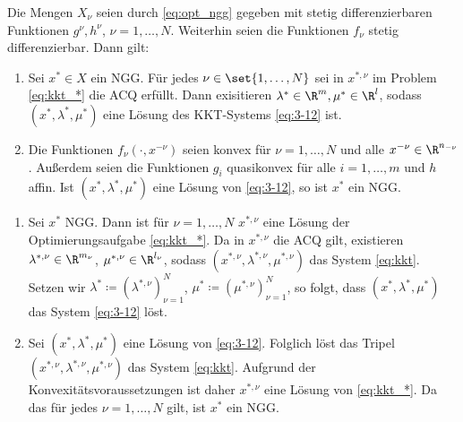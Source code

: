 \begin{satz}\label{thm:3.19}
  Die Mengen $X_{\nu}$ seien durch \eqref{eq:opt_ngg} gegeben mit stetig differenzierbaren Funktionen $g^{\nu}, h^{\nu}$, $\nu = 1, \dots, N$. Weiterhin seien die Funktionen $f_{\nu}$ stetig differenzierbar. Dann gilt:
  \begin{enumerate}
  \item Sei $x^{*} \in X$ ein NGG. Für jedes $\nu \in \set{1, \dots, N}$ sei in $x^{*, \nu}$ im Problem \eqref{eq:kkt_*} die ACQ erfüllt. Dann exisitieren $\lambda^{*} \in \R^{m}, \mu^{*} \in \R^{l}$, sodass $(x^{*}, \lambda^{*}, \mu^{*})$ eine Lösung des KKT-Systems \eqref{eq:3-12} ist. 
  \item Die Funktionen $f_{\nu}(\cdot, x^{-\nu})$ seien konvex für $\nu = 1, \dots, N$ und alle $x^{-\nu} \in \R^{n_{-\nu}}$. Außerdem seien die Funktionen $g_{i}$ quasikonvex für alle $i = 1, \dots, m$ und $h$ affin. Ist $(x^{*}, \lambda^{*}, \mu^{*})$ eine Lösung von \eqref{eq:3-12}, so ist $x^{*}$ ein NGG. 
  \end{enumerate}
\end{satz}
\begin{beweis}
  \begin{enumerate}
  \item Sei $x^{*}$ NGG. Dann ist für $\nu = 1, \dots, N$ $x^{*, \nu}$ eine Lösung der Optimierungsaufgabe \eqref{eq:kkt_*}. Da in $x^{*, \nu}$ die ACQ gilt, existieren $\lambda^{*, \nu}\in \R^{m_{\nu}}$, $\mu^{*, \nu}\in \R^{l_{\nu}}$, sodass $(x^{*, \nu}, \lambda^{*, \nu}, \mu^{*, \nu})$  das System \eqref{eq:kkt}. Setzen wir $\lambda^{*} \coloneqq (\lambda^{*, \nu})_{\nu = 1}^{N}$, $\mu^{*} \coloneqq (\mu^{*, \nu})_{\nu = 1}^{N}$, so folgt, dass  $(x^{*}, \lambda^{*}, \mu^{*})$  das System \eqref{eq:3-12} löst. 
  \item Sei $(x^{*}, \lambda^{*}, \mu^{*})$ eine Lösung von \eqref{eq:3-12}. Folglich löst das Tripel  $(x^{*, \nu}, \lambda^{*, \nu}, \mu^{*, \nu})$ das System \eqref{eq:kkt}. Aufgrund der Konvexitätsvoraussetzungen ist daher $x^{*,\nu}$ eine Lösung von \eqref{eq:kkt_*}. Da das für jedes $\nu = 1, \dots, N$ gilt, ist $x^{*}$ ein NGG.  
  \end{enumerate}
\end{beweis}
